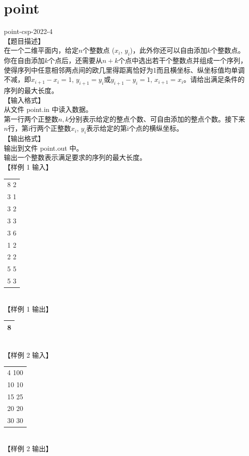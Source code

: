 \documentclass[12pt,twiside,a4paper]{ctexbook}
\numberwithin{chapter}{part}
\begin{document}
\section{point}
point-csp-2022-4\\
【题目描述】\\
在一个二维平面内，给定$n$个整数点 ($x_i$, $y_i$)，此外你还可以自由添加$k$个整数点。你在自由添加$k$个点后，还需要从$n+k$个点中选出若干个整数点并组成一个序列，使得序列中任意相邻两点间的欧几里得距离恰好为1而且横坐标、纵坐标值均单调不减，即$x_{i+1} −x_i=1$, $y_{i+1}=y_i$或$y_{i+1}−y_i=1$, $x_{i+1}=x_i$。请给出满足条件的序列的最大长度。\\
【输入格式】\\
从文件 point.in 中读入数据。\\
第一行两个正整数$n,k$分别表示给定的整点个数、可自由添加的整点个数。接下来$n$行，第i行两个正整数$x_i$, $y_i$表示给定的第i个点的横纵坐标。\\
【输出格式】\\
输出到文件 point.out 中。\\
输出一个整数表示满足要求的序列的最大长度。\\
【样例 1 输入】\\
\begin{tabular}{|c|}
\hline
8 2\\
3 1\\
3 2\\
3 3\\
3 6\\
1 2\\
2 2\\
5 5\\
5 3\\
\hline
\end{tabular}\\
【样例 1 输出】\\
\begin{tabular}{|c|}
\hline
8\\
\hline
\end{tabular}\\
【样例 2 输入】\\
\begin{tabular}{|c|}
\hline
4 100\\
10 10\\
15 25\\
20 20\\
30 30\\
\hline
\end{tabular}\\
【样例 2 输出】\\
\end{document}
